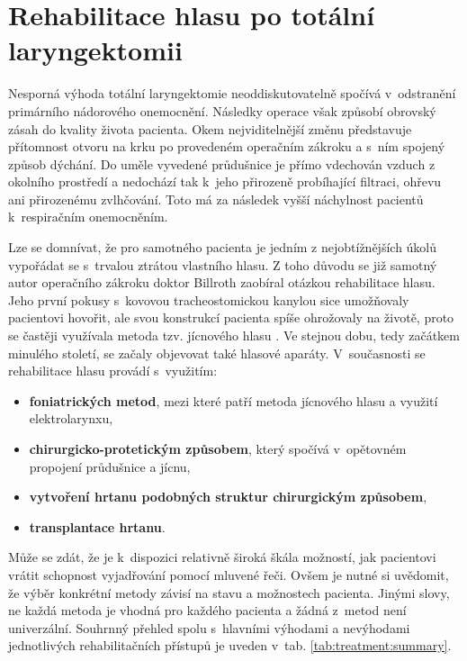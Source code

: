 \section{Rehabilitace hlasu po totální laryngektomii}
\label{chap:cause:treatment}

Nesporná výhoda totální laryngektomie neoddiskutovatelně spočívá v~odstranění
primárního nádorového onemocnění. Následky operace však způsobí obrovský
zásah do kvality života pacienta. Okem nejviditelnější změnu představuje
přítomnost otvoru na krku po provedeném operačním zákroku a s~ním spojený způsob dýchání.
Do uměle vyvedené průdušnice je přímo vdechován vzduch z okolního prostředí a nedochází tak  k~jeho přirozeně probíhající filtraci, ohřevu ani přirozenému zvlhčování. Toto má za následek vyšší náchylnost pacientů  k~respiračním onemocněním.

Lze se domnívat, že pro samotného pacienta je jedním z nejobtížnějších úkolů vypořádat se s~trvalou
ztrátou vlastního hlasu. Z toho důvodu se již samotný autor operačního zákroku doktor
Billroth zaobíral otázkou rehabilitace hlasu. Jeho první pokusy s~kovovou
tracheostomickou kanylou sice umožňovaly pacientovi hovořit, ale svou
konstrukcí pacienta spíše ohrožovaly na životě, proto se častěji využívala
metoda tzv. jícnového hlasu \cite{Sebova-Sedenkova2006}. Ve stejnou
dobu, tedy začátkem minulého století, se začaly objevovat také %
hlasové aparáty. V~současnosti se rehabilitace hlasu provádí s~využitím: %

\begin{itemize}
  \item \textbf{foniatrických metod}, mezi které patří metoda jícnového hlasu a využití elektrolarynxu,
  \item \textbf{chirurgicko-protetickým způsobem}, který spočívá v~opětovném propojení průdušnice a jícnu,
  \item \textbf{vytvoření hrtanu podobných struktur chirurgickým způsobem},
  \item \textbf{transplantace hrtanu}.
\end{itemize}

\noindent Může se zdát, že je  k~dispozici relativně široká škála možností, jak pacientovi vrátit schopnost vyjadřování pomocí mluvené řeči.
Ovšem je nutné si uvědomit, že výběr konkrétní metody závisí na stavu
a možnostech pacienta.
Jinými slovy, ne každá metoda je vhodná pro každého pacienta a žádná z~metod není univerzální.
Souhrnný přehled spolu s~hlavními výhodami a nevýhodami jednotlivých rehabilitačních přístupů je uveden v~tab. \ref{tab:treatment:summary}.

